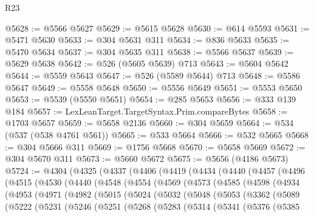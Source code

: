 \begin{lexlean}{R23}
\begin{coremodule}
@5628 := @5566 @5627
@5629 := @5615 @5628
@5630 := @614 @5593
@5631 := @5471 @5630
@5633 := @304 @5631 @311
@5634 := @836 @5633
@5635 := @5470 @5634
@5637 := @304 @5635 @311
@5638 := @5566 @5637
@5639 := @5629 @5638
@5642 := @526 (@5605 @5639) @713
@5643 := @5604 @5642
@5644 := @5559 @5643
@5647 := @526 (@5589 @5644) @713
@5648 := @5586 @5647
@5649 := @5558 @5648
@5650 := @5556 @5649
@5651 := @5553 @5650
@5653 := @5539 (@5550 @5651)
@5654 := @285 @5653
@5656 := @333 @139 @184
@5657 := LexLeanTarget.TargetSyntax.Prim.compareBytes
@5658 := @1703 @5657
@5659 := @5658 @2136
@5660 := @304 @5659
@5664 := @534 (@537 (@538 @4761 @561))
@5665 := @533 @5664
@5666 := @532 @5665
@5668 := @304 @5666 @311
@5669 := @1756 @5668
@5670 := @5658 @5669
@5672 := @304 @5670 @311
@5673 := @5660 @5672
@5675 := @5656 (@4186 @5673)
@5724 := @4304
    (@4325
      (@4337
        (@4406
          (@4419
            (@4434
              (@4440
                (@4457
                  (@4496
                    (@4515
                      (@4530
                        (@4440
                          (@4548
                            (@4554
                              (@4569
                                (@4573
                                  (@4585
                                    (@4598
                                      (@4934
                                        (@4953
                                          (@4971
                                            (@4982
                                              (@5015
                                                (@5024
                                                  (@5032
                                                    (@5048
                                                      (@5053
                                                        (@3362
                                                          (@5089
                                                            (@5222
                                                              (@5231
                                                                (@5246
                                                                  (@5251
                                                                    (@5268
                                                                      (@5283
                                                                        (@5314
                                                                          (@5341
                                                                            (@5376
                                                                              (@5385

\end{coremodule}
\end{lexlean}
